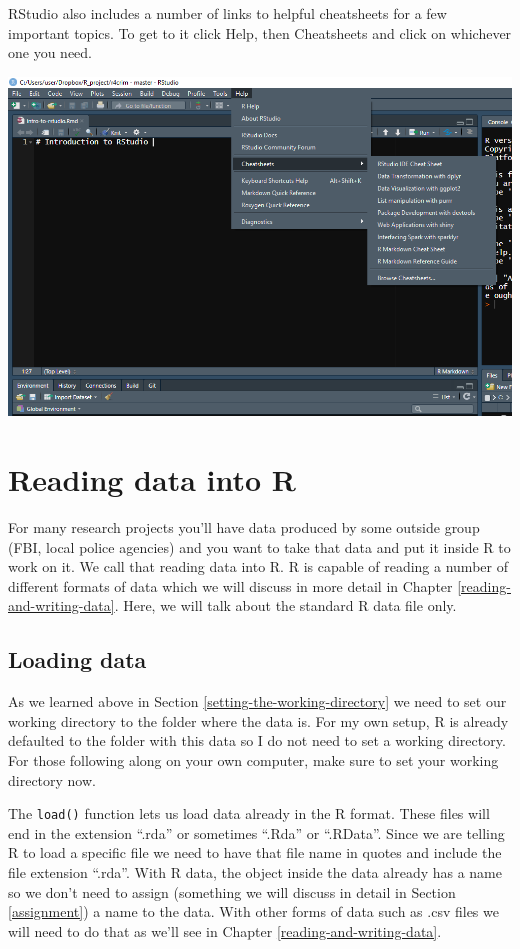 \documentclass[
  12pt,
]{book}
\begin{document}
RStudio also includes a number of links to helpful cheatsheets for a few important topics. To get to it click Help, then Cheatsheets and click on whichever one you need.

\includegraphics{images/rstudio_4.PNG}

\hypertarget{reading-data-into-r}{%
\section{Reading data into R}\label{reading-data-into-r}}

For many research projects you'll have data produced by some outside group (FBI, local police agencies) and you want to take that data and put it inside R to work on it. We call that reading data into R. R is capable of reading a number of different formats of data which we will discuss in more detail in Chapter \ref{reading-and-writing-data}. Here, we will talk about the standard R data file only.

\hypertarget{loading-data}{%
\subsection{Loading data}\label{loading-data}}

As we learned above in Section \ref{setting-the-working-directory} we need to set our working directory to the folder where the data is. For my own setup, R is already defaulted to the folder with this data so I do not need to set a working directory. For those following along on your own computer, make sure to set your working directory now.

The \texttt{load()} function lets us load data already in the R format. These files will end in the extension ``.rda'' or sometimes ``.Rda'' or ``.RData''. Since we are telling R to load a specific file we need to have that file name in quotes and include the file extension ``.rda''. With R data, the object inside the data already has a name so we don't need to assign (something we will discuss in detail in Section \ref{assignment}) a name to the data. With other forms of data such as .csv files we will need to do that as we'll see in Chapter \ref{reading-and-writing-data}.
\end{document}
